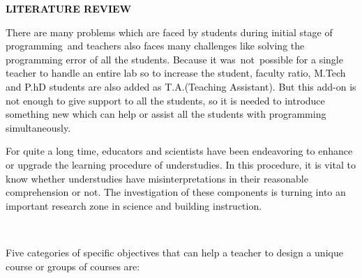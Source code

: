 \documentclass[12pt]{report}
\renewcommand{\_}{\kern-1.5pt\textunderscore\kern-1.5pt}
\begin{document}
\vspace{\baselineskip}
\begin{adjustwidth}{2.7in}{0.84in}
{\fontsize{24pt}{28.8pt}\selectfont \textbf{\textcolor[HTML]{0D0D0D}{LITERATURE REVIEW}}\par}\par

\end{adjustwidth}


\vspace{\baselineskip}

\vspace{\baselineskip}
\vspace{\baselineskip}

\vspace{\baselineskip}
\begin{adjustwidth}{0.2in}{0.84in}
\textcolor[HTML]{0D0D0D}{There are many problems which are faced by students during initial stage of programming\ and teachers also faces many challenges like solving the programming error of all the students.  Because it was\  not\ possible for a single teacher to handle an entire lab so  to increase the student, faculty ratio, M.Tech and P.hD students are also added as T.A.(Teaching Assistant). But this add-on is not enough to give support to all the students, so it is needed to introduce something new which can help or assist all the students with programming simultaneously.}\par

\end{adjustwidth}

\begin{adjustwidth}{0.2in}{0.84in}
\textcolor[HTML]{0D0D0D}{For quite a long time, educators and scientists have been endeavoring to enhance or upgrade the learning procedure of understudies. In this procedure, it is vital to know whether understudies have misinterpretations in their reasonable comprehension or not. The investigation of these components is turning into an important research zone in science and building instruction.}\par

\end{adjustwidth}

\begin{adjustwidth}{0.2in}{0.84in}
\textcolor[HTML]{0D0D0D}{\  }\par

\end{adjustwidth}

\begin{adjustwidth}{0.2in}{0.84in}
\textcolor[HTML]{0D0D0D}{Five categories of specific objectives that can help a teacher to design a unique course or groups of courses are:}\par

\end{adjustwidth}
\end{document}
